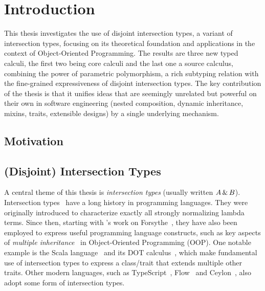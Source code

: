 
\chapter{Introduction}




This thesis investigates the use of disjoint intersection types, a variant of
intersection types, focusing on its theoretical foundation and applications in
the context of Object-Oriented Programming. The results are three new typed
calculi, the first two being core calculi and the last one a source calculus,
combining the power of parametric polymorphism, a rich subtyping relation with
the fine-grained expressiveness of disjoint intersection types. The key
contribution of the thesis is that it unifies ideas that are seemingly unrelated
but powerful on their own in software engineering (nested composition, dynamic
inheritance, mixins, traits, extensible designs) by a single underlying
mechanism.


\section{Motivation}



\section{(Disjoint) Intersection Types}

A central theme of this thesis is \textit{intersection types} (usually written $A \,\&\, B$). Intersection
types~\citep{pottinger1980type, coppoInter} have a long history in
programming languages. They were originally introduced to characterize exactly
all strongly normalizing lambda terms. Since then, starting with
\citeauthor{reynolds1988preliminary}'s work on
Forsythe~\citep{reynolds1988preliminary}, they have also been employed to
express useful programming language constructs, such as key aspects of
\emph{multiple inheritance}~\citep{compagnoni1996higher} in Object-Oriented
Programming (OOP). One notable example is the Scala
language~\citep{odersky2004overview} and its DOT
calculus~\citep{amin2012dependent}, which make fundamental use of intersection
types to express a class/trait that extends multiple other traits. Other modern
languages, such as TypeScript~\citep{typescript}, Flow~\citep{flow} and
Ceylon~\citep{ceylon}, also adopt some form of intersection types.

